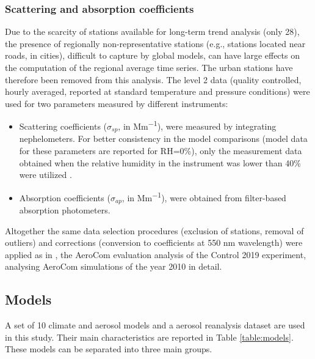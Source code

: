 \documentclass[acp, manuscript]{copernicus}
\begin{document}
\subsubsection{Scattering and absorption coefficients}
Due to the scarcity of stations available for long-term trend analysis (only 28), the presence of regionally non-representative stations (e.g., stations located near roads, in cities), difficult to capture by global models, can have large effects on the computation of the regional average time series. The urban stations have therefore been removed from this analysis. The level 2 data (quality controlled, hourly averaged, reported at standard temperature and pressure conditions) were used for two parameters measured by different instruments:

\begin{itemize}
 \item Scattering coefficients ($\sigma_{sp}$, in \unit{Mm^{-1}}), were measured by integrating nephelometers. For better consistency in the model comparisons (model data for these parameters are reported for RH=0\%), only the measurement data obtained when the relative humidity in the instrument was lower than 40\% were utilized \citep{pandolfi2018european}.
 \item Absorption coefficients ($\sigma_{ap}$, in \unit{Mm^{-1}}), were obtained from filter-based absorption photometers.
\end{itemize}

Altogether the same data selection procedures (exclusion of stations, removal of outliers) and corrections (conversion to coefficients at 550 nm wavelength) were applied as in \cite{jonaseval}, the AeroCom evaluation analysis of the Control 2019 experiment, analysing AeroCom simulations of the year 2010 in detail.

\subsection{Models}
A set of 10 climate and aerosol models and a aerosol reanalysis dataset are used in this study. Their main characteristics are reported in Table \ref{table:models}. These models can be separated into three main groups.
\end{document}
